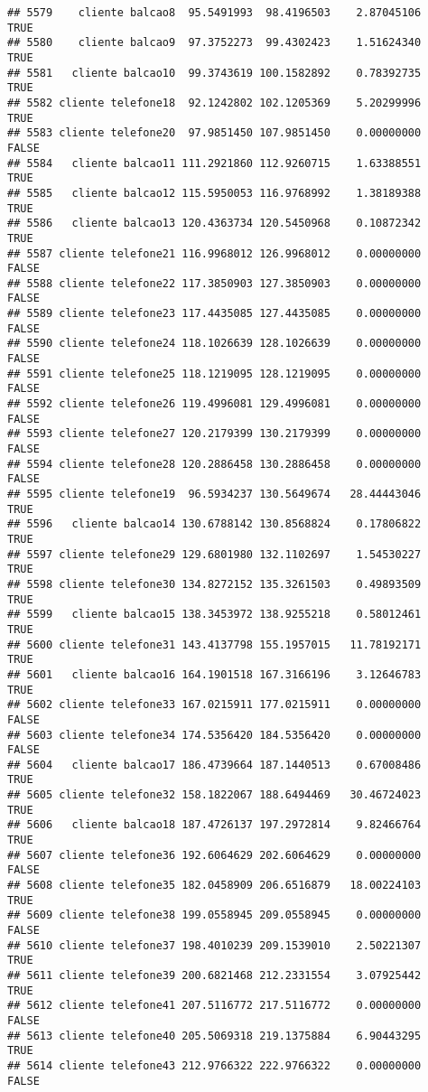 \documentclass[
]{article}
\begin{document}
\begin{verbatim}
## 5579    cliente balcao8  95.5491993  98.4196503    2.87045106     TRUE
## 5580    cliente balcao9  97.3752273  99.4302423    1.51624340     TRUE
## 5581   cliente balcao10  99.3743619 100.1582892    0.78392735     TRUE
## 5582 cliente telefone18  92.1242802 102.1205369    5.20299996     TRUE
## 5583 cliente telefone20  97.9851450 107.9851450    0.00000000    FALSE
## 5584   cliente balcao11 111.2921860 112.9260715    1.63388551     TRUE
## 5585   cliente balcao12 115.5950053 116.9768992    1.38189388     TRUE
## 5586   cliente balcao13 120.4363734 120.5450968    0.10872342     TRUE
## 5587 cliente telefone21 116.9968012 126.9968012    0.00000000    FALSE
## 5588 cliente telefone22 117.3850903 127.3850903    0.00000000    FALSE
## 5589 cliente telefone23 117.4435085 127.4435085    0.00000000    FALSE
## 5590 cliente telefone24 118.1026639 128.1026639    0.00000000    FALSE
## 5591 cliente telefone25 118.1219095 128.1219095    0.00000000    FALSE
## 5592 cliente telefone26 119.4996081 129.4996081    0.00000000    FALSE
## 5593 cliente telefone27 120.2179399 130.2179399    0.00000000    FALSE
## 5594 cliente telefone28 120.2886458 130.2886458    0.00000000    FALSE
## 5595 cliente telefone19  96.5934237 130.5649674   28.44443046     TRUE
## 5596   cliente balcao14 130.6788142 130.8568824    0.17806822     TRUE
## 5597 cliente telefone29 129.6801980 132.1102697    1.54530227     TRUE
## 5598 cliente telefone30 134.8272152 135.3261503    0.49893509     TRUE
## 5599   cliente balcao15 138.3453972 138.9255218    0.58012461     TRUE
## 5600 cliente telefone31 143.4137798 155.1957015   11.78192171     TRUE
## 5601   cliente balcao16 164.1901518 167.3166196    3.12646783     TRUE
## 5602 cliente telefone33 167.0215911 177.0215911    0.00000000    FALSE
## 5603 cliente telefone34 174.5356420 184.5356420    0.00000000    FALSE
## 5604   cliente balcao17 186.4739664 187.1440513    0.67008486     TRUE
## 5605 cliente telefone32 158.1822067 188.6494469   30.46724023     TRUE
## 5606   cliente balcao18 187.4726137 197.2972814    9.82466764     TRUE
## 5607 cliente telefone36 192.6064629 202.6064629    0.00000000    FALSE
## 5608 cliente telefone35 182.0458909 206.6516879   18.00224103     TRUE
## 5609 cliente telefone38 199.0558945 209.0558945    0.00000000    FALSE
## 5610 cliente telefone37 198.4010239 209.1539010    2.50221307     TRUE
## 5611 cliente telefone39 200.6821468 212.2331554    3.07925442     TRUE
## 5612 cliente telefone41 207.5116772 217.5116772    0.00000000    FALSE
## 5613 cliente telefone40 205.5069318 219.1375884    6.90443295     TRUE
## 5614 cliente telefone43 212.9766322 222.9766322    0.00000000    FALSE

\end{verbatim}
\end{document}
